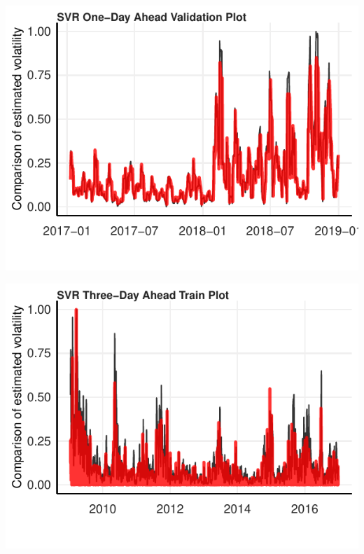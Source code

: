 \documentclass[11pt,preprint, authoryear]{elsarticle}
\let\origfigure\figure
\let\endorigfigure\endfigure
\renewenvironment{figure}[1][2] {
    \expandafter\origfigure\expandafter[H]
} {
    \endorigfigure
}
\numberwithin{equation}{section}
\numberwithin{figure}{section}
\numberwithin{table}{section}
\begin{document}
\begin{figure}[H]

{\centering \includegraphics{Essay_files/figure-latex/plot_6-1} 

}

\caption{SVR One-Day Ahead Validation Forecast}\label{fig:plot_6}
\end{figure}

\begin{figure}[H]

{\centering \includegraphics{Essay_files/figure-latex/plot_7-1} 

}

\caption{SVR Three-Day Ahead Training Forecast}\label{fig:plot_7}
\end{figure}
\end{document}
